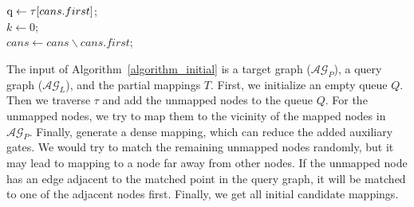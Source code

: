 \documentclass[runningheads]{llncs}
\begin{document}
\begin{algorithm}
{{{{					$\textup{q} \leftarrow \tau[cans.first]$; \\
					$k \leftarrow 0$; \\
					$cans \leftarrow cans\backslash cans.first$; \\
				}
			}
		}
	}
	\end{algorithm}
	
	The input of Algorithm~\ref{algorithm_initial} is a target graph ($\mathcal{AG}_{P}$), a query graph ($\mathcal{AG}_{L}$), and the partial mappings $T$. First, we initialize an empty queue $Q$.
	Then we traverse $\tau$ and add the unmapped nodes to the queue $Q$. For the unmapped nodes, we try to map them to the vicinity of the mapped nodes in $\mathcal{AG}_{P}$. Finally, generate a dense mapping, which can reduce the added auxiliary gates. We would try to match the remaining unmapped nodes randomly, but it may lead to mapping to a node far away from other nodes. If the unmapped node has an edge adjacent to the matched point in the query graph, it will be matched to one of the adjacent nodes first.  Finally, we get all initial candidate mappings.
\end{document}
